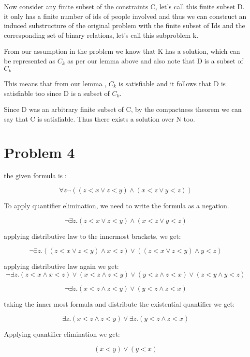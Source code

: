 \documentclass{article}
\begin{document}
\begin{enumerate}
    Now consider any finite subset of the constraints C, let's call this finite subset D. it only has a finite number of ids of people involved and thus we can construct an induced substructure of the original problem with the finite subset of Ids and the corresponding set of binary relations, let's call this subproblem k.

    From our assumption in the problem we know that K has a solution, which can be represented as $C_k$ as per our lemma above and also note that D is a subset of $C_k$

    This means that from our lemma , $C_k$ is satisfiable and it follows that D is satisfiable too since D is a subset of $C_k$.

    Since D was an arbitrary finite subset of C, by the compactness theorem we can say that C is satisfiable. Thus there exists a solution over N too.

 \end{enumerate}



\section{Problem 4}

the given formula is :

$$\forall z \neg ((z < x \lor z < y) \land (x < z \lor y< z))$$

To apply quantifier elimination, we need to write the formula as a negation.

$$\neg \exists z. (z < x \lor z < y) \land (x < z \lor y < z)$$

applying distributive law to the innermost brackets, we get:

$$\neg \exists z. ((z < x \lor z < y) \land x < z) \lor ((z < x \lor z < y) \land y < z)$$

applying distributive law again we get:
$$\neg \exists z. (z < x \land x < z) \lor (x < z \land z < y) \lor (y < z \land z < x) \lor (z < y \land y < z)$$

$$\neg \exists z. (x < z \land z < y) \lor (y < z \land z < x)$$

taking the inner most formula and distribute the existential quantifier we get: 

$$\exists z. (x < z \land z < y) \lor \exists z. (y < z \land z < x)$$

Applying quantifier elimination we get:

$$ (x < y) \lor (y < x)$$
\end{document}
